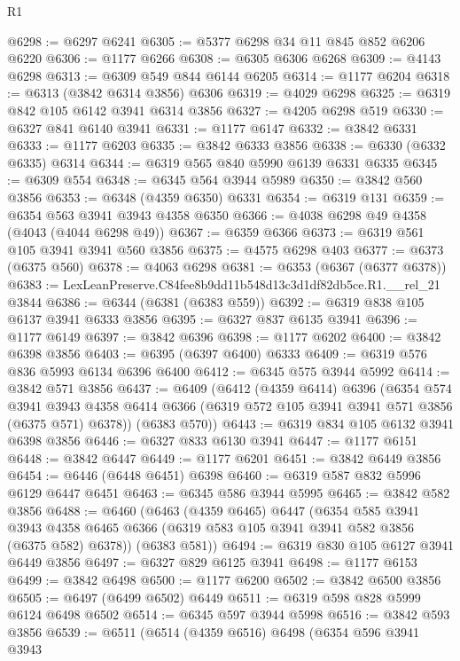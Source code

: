 \begin{lexlean}{R1}
\begin{coremodule}
@6298 := @6297 @6241
@6305 := @5377 @6298 @34 @11 @845 @852 @6206 @6220
@6306 := @1177 @6266
@6308 := @6305 @6306 @6268
@6309 := @4143 @6298
@6313 := @6309 @549 @844 @6144 @6205
@6314 := @1177 @6204
@6318 := @6313 (@3842 @6314 @3856) @6306
@6319 := @4029 @6298
@6325 := @6319 @842 @105 @6142 @3941 @6314 @3856
@6327 := @4205 @6298 @519
@6330 := @6327 @841 @6140 @3941
@6331 := @1177 @6147
@6332 := @3842 @6331
@6333 := @1177 @6203
@6335 := @3842 @6333 @3856
@6338 := @6330 (@6332 @6335) @6314
@6344 := @6319 @565 @840 @5990 @6139 @6331 @6335
@6345 := @6309 @554
@6348 := @6345 @564 @3944 @5989
@6350 := @3842 @560 @3856
@6353 := @6348 (@4359 @6350) @6331
@6354 := @6319 @131
@6359 := @6354 @563 @3941 @3943 @4358 @6350
@6366 := @4038 @6298 @49 @4358 (@4043 (@4044 @6298 @49))
@6367 := @6359 @6366
@6373 := @6319 @561 @105 @3941 @3941 @560 @3856
@6375 := @4575 @6298 @403
@6377 := @6373 (@6375 @560)
@6378 := @4063 @6298
@6381 := @6353 (@6367 (@6377 @6378))
@6383 := LexLeanPreserve.C84fee8b9dd11b548d13c3d1df82db5ce.R1.__rel_21 @3844
@6386 := @6344 (@6381 (@6383 @559))
@6392 := @6319 @838 @105 @6137 @3941 @6333 @3856
@6395 := @6327 @837 @6135 @3941
@6396 := @1177 @6149
@6397 := @3842 @6396
@6398 := @1177 @6202
@6400 := @3842 @6398 @3856
@6403 := @6395 (@6397 @6400) @6333
@6409 := @6319 @576 @836 @5993 @6134 @6396 @6400
@6412 := @6345 @575 @3944 @5992
@6414 := @3842 @571 @3856
@6437 := @6409
    (@6412
      (@4359 @6414)
      @6396
      (@6354
        @574
        @3941
        @3943
        @4358
        @6414
        @6366
        (@6319 @572 @105 @3941 @3941 @571 @3856 (@6375 @571) @6378))
      (@6383 @570))
@6443 := @6319 @834 @105 @6132 @3941 @6398 @3856
@6446 := @6327 @833 @6130 @3941
@6447 := @1177 @6151
@6448 := @3842 @6447
@6449 := @1177 @6201
@6451 := @3842 @6449 @3856
@6454 := @6446 (@6448 @6451) @6398
@6460 := @6319 @587 @832 @5996 @6129 @6447 @6451
@6463 := @6345 @586 @3944 @5995
@6465 := @3842 @582 @3856
@6488 := @6460
    (@6463
      (@4359 @6465)
      @6447
      (@6354
        @585
        @3941
        @3943
        @4358
        @6465
        @6366
        (@6319 @583 @105 @3941 @3941 @582 @3856 (@6375 @582) @6378))
      (@6383 @581))
@6494 := @6319 @830 @105 @6127 @3941 @6449 @3856
@6497 := @6327 @829 @6125 @3941
@6498 := @1177 @6153
@6499 := @3842 @6498
@6500 := @1177 @6200
@6502 := @3842 @6500 @3856
@6505 := @6497 (@6499 @6502) @6449
@6511 := @6319 @598 @828 @5999 @6124 @6498 @6502
@6514 := @6345 @597 @3944 @5998
@6516 := @3842 @593 @3856
@6539 := @6511
    (@6514
      (@4359 @6516)
      @6498
      (@6354
        @596
        @3941
        @3943

\end{coremodule}
\end{lexlean}

